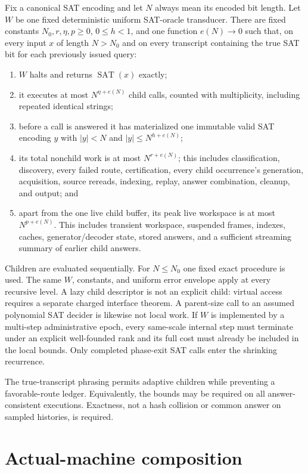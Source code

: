\documentclass[11pt]{article}
\newcommand{\SAT}{\operatorname{SAT}}
\begin{document}
Fix a canonical SAT encoding and let $N$ always mean its encoded bit length.
Let $W$ be one fixed deterministic uniform SAT-oracle transducer.  There are
fixed constants $N_0,r,\eta,p\ge0$, $0\le h<1$, and one function
$e(N)\to0$ such that, on every input $x$ of length $N>N_0$ and on every
transcript containing the true SAT bit for each previously issued query:
\begin{enumerate}
\item $W$ halts and returns $\SAT(x)$ exactly;
\item it executes at most $N^{\eta+e(N)}$ child calls, counted with
  multiplicity, including repeated identical strings;
\item before a call is answered it has materialized one immutable valid SAT
  encoding $y$ with $|y|<N$ and $|y|\le N^{h+e(N)}$;
\item its total nonchild work is at most $N^{r+e(N)}$; this includes
  classification, discovery, every failed route, certification, every child
  occurrence's generation, acquisition, source rereads, indexing, replay,
  answer combination, cleanup, and output; and
\item apart from the one live child buffer, its peak live workspace is at
  most $N^{p+e(N)}$.  This includes transient workspace, suspended frames,
  indexes, caches, generator/decoder state, stored answers, and a sufficient
  streaming summary of earlier child answers.
\end{enumerate}
Children are evaluated sequentially.  For $N\le N_0$ one fixed exact
procedure is used.  The same $W$, constants, and uniform error envelope apply
at every recursive level.  A lazy child descriptor is not an explicit child:
virtual access requires a separate charged interface theorem.  A parent-size
call to an assumed polynomial SAT decider is likewise not local work.
If $W$ is implemented by a multi-step administrative epoch, every same-scale
internal step must terminate under an explicit well-founded rank and its full
cost must already be included in the local bounds.  Only completed phase-exit
SAT calls enter the shrinking recurrence.

The true-transcript phrasing permits adaptive children while preventing a
favorable-route ledger.  Equivalently, the bounds may be required on all
answer-consistent executions.  Exactness, not a hash collision or common
answer on sampled histories, is required.

\section{Actual-machine composition}
\end{document}
